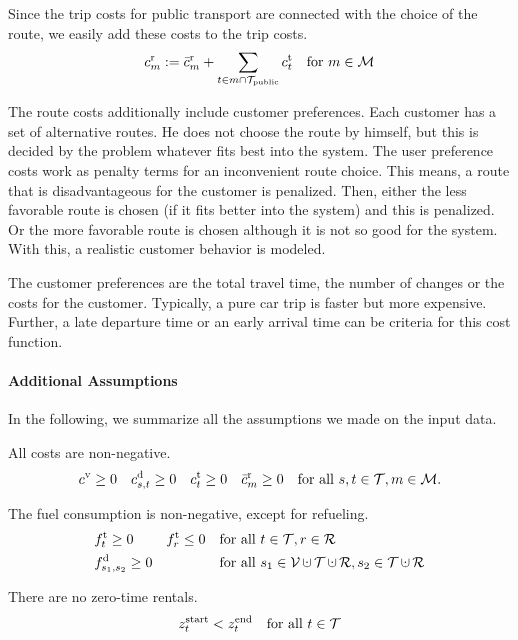 Since the trip costs for public transport are connected with the choice of the route, we easily add these costs to the trip costs.
\begin{align*}
	c^{\operatorname{r}}_m := \bar{c}^{\operatorname{r}}_m + \sum_{t\in m\cap\mathcal{T}_{\operatorname{public}}}c^{\operatorname{t}}_t && \text{for } m\in\mathcal{M}
\end{align*}

The route costs additionally include customer preferences. Each customer has a set of alternative routes. He does not choose the route by himself, but this is decided by the problem whatever fits best into the system. The user preference costs work as penalty terms for an inconvenient route choice. This means, a route that is disadvantageous for the customer is penalized. Then, either the less favorable route is chosen (if it fits better into the system) and this is penalized. Or the more favorable route is chosen although it is not so good for the system. With this, a realistic customer behavior is modeled.

The customer preferences are \eg the total travel time, the number of changes or the costs for the customer. Typically, a pure car trip is faster but more expensive. Further, a late departure time or an early arrival time can be criteria for this cost function.

\paragraph{Additional Assumptions} \parfill

In the following, we summarize all the assumptions we made on the input data.

All costs are non-negative.
\begin{align}
\label{eq:nonnegativ_cost}
	c^{\operatorname{v}}\geq 0 && c^{\operatorname{d}}_{s,t}\geq 0 && c^{\operatorname{t}}_t\geq 0 && \bar{c}^{\operatorname{r}}_m\geq 0 && \text{for all } s,t\in\mathcal{T}, m\in\mathcal{M}.
\end{align}

The fuel consumption is non-negative, except for refueling.
\begin{align}
	& \ft_t\geq 0 && \ft_r\leq 0 && \text{for all } t\in\mathcal{T}, r\in\mathcal{R} \\
	& \fd_{s_1,s_2} \geq 0 &&&& \text{for all } s_1\in\mathcal{V}\cupdot\mathcal{T}\cupdot\mathcal{R},s_2\in\mathcal{T}\cupdot\mathcal{R}
\end{align}

There are no zero-time rentals.
\begin{align}
\label{eq:notime_trip}
	z^{\operatorname{start}}_t < z^{\operatorname{end}}_t && \text{for all } t\in\mathcal{T}
\end{align}

